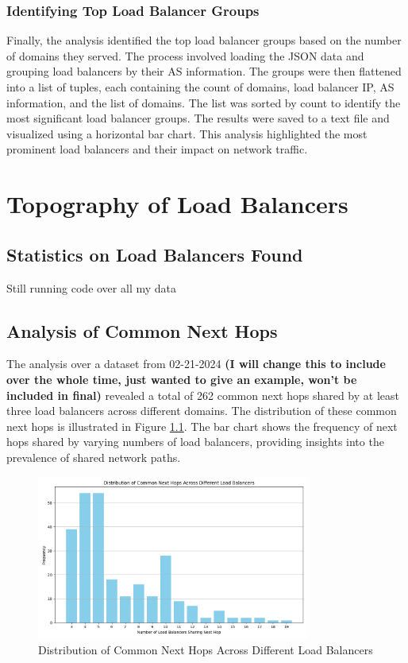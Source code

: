 \documentclass[12pt]{cwru_thesis}
\begin{document}
\subsection{Identifying Top Load Balancer Groups}
Finally, the analysis identified the top load balancer groups based on the number of domains they served. The process involved loading the JSON data and grouping load balancers by their AS information. The groups were then flattened into a list of tuples, each containing the count of domains, load balancer IP, AS information, and the list of domains. The list was sorted by count to identify the most significant load balancer groups. The results were saved to a text file and visualized using a horizontal bar chart. This analysis highlighted the most prominent load balancers and their impact on network traffic.



\chapter{Topography of Load Balancers}
\section{Statistics on Load Balancers Found}

Still running code over all my data

\section{Analysis of Common Next Hops}
The analysis over a dataset from 02-21-2024 \textbf{(I will change this to include over the whole time, just wanted to give an example, won't be included in final)} revealed a total of 262 common next hops shared by at least three load balancers across different domains. The distribution of these common next hops is illustrated in Figure \ref{fig:common_next_hops_distribution}. The bar chart shows the frequency of next hops shared by varying numbers of load balancers, providing insights into the prevalence of shared network paths.

\begin{figure}[h]
    \centering
    \includegraphics[width=0.8\textwidth]{figures/common_next_hops_distribution.png}
    \caption{Distribution of Common Next Hops Across Different Load Balancers }
    \label{fig:common_next_hops_distribution}
\end{figure}
\end{document}
